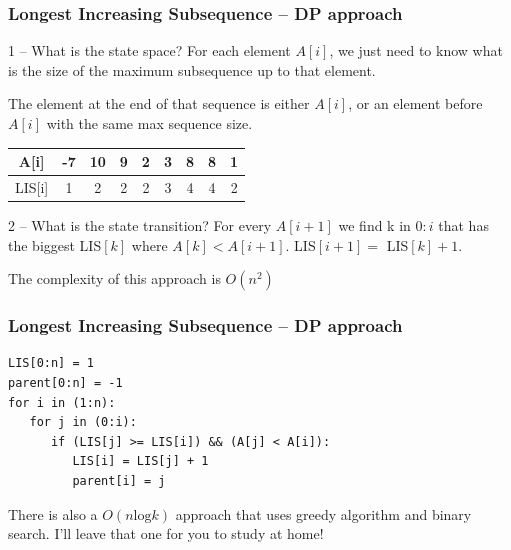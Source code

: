 \documentclass{beamer}
\begin{document}
\begin{frame}
  \frametitle{Longest Increasing Subsequence -- DP approach}
  {\smaller
  \begin{block}{1 -- What is the state space?}
    For each element $A[i]$, we just need to know what is the size of
    the maximum subsequence up to that element.

    \medskip

    The element at the end of that sequence is either $A[i]$, or an element 
    before $A[i]$ with the same max sequence size.
  \end{block}

  \bigskip

  \begin{tabular}{|c|c|c|c|c|c|c|c|c|}
    \hline
    A[i] & -7 & 10 & 9 & 2 & 3 & 8 & 8 & 1\\
    \hline
    LIS[i] & 1 & 2 & 2 & 2 & 3 & 4 & 4 & 2\\
    \hline
  \end{tabular}

  \begin{block}{2 -- What is the state transition?}
    For every $A[i+1]$ we find k in $0:i$ that has the biggest
    LIS$[k]$ where $A[k] < A[i+1]$. LIS$[i+1] =$ LIS$[k] + 1$.
  \end{block}

  The complexity of this approach is $O(n^2)$
  }
\end{frame}

\begin{frame}
  \frametitle{Longest Increasing Subsequence -- DP approach}
  {\small
\begin{verbatim}
LIS[0:n] = 1
parent[0:n] = -1
for i in (1:n):
   for j in (0:i):
      if (LIS[j] >= LIS[i]) && (A[j] < A[i]):
         LIS[i] = LIS[j] + 1
         parent[i] = j
\end{verbatim}
  }

\vfill

\begin{block}{}
  There is also a $O(n\text{log}k)$ approach that uses greedy
  algorithm and binary search. I'll leave that one for you to study at home!
\end{block}
\end{frame}
\end{document}
